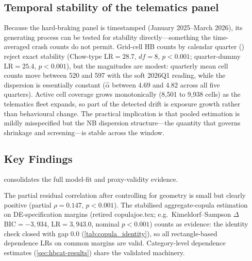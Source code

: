 \documentclass[letterpaper,8pt]{extarticle}  %
\newcommand{\file}[1]{{\ttfamily\def\_{\textunderscore\allowbreak}#1}}
\begin{document}
\begin{doublespacing}
\begin{linenumbers}


\subsection{Temporal stability of the telematics panel}\label{sec:temporal-stability}

Because the hard-braking panel is timestamped (January 2025--March 2026), its generating process can be tested for stability directly---something the time-averaged crash counts do not permit. Grid-cell HB counts by calendar quarter () reject exact stability (Chow-type LR$=28.7$, $df=8$, $p<0.001$; quarter-dummy LR$=25.4$, $p<0.001$), but the magnitudes are modest: quarterly mean cell counts move between 520 and 597 with the soft 2026Q1 reading, while the dispersion is essentially constant ($\hat\alpha$ between 4.69 and 4.82 across all five quarters). Active cell coverage grows monotonically (8,501 to 9,938 cells) as the telematics fleet expands, so part of the detected drift is exposure growth rather than behavioural change. The practical implication is that pooled estimation is mildly misspecified but the NB dispersion structure---the quantity that governs shrinkage and screening---is stable across the window.



\FloatBarrier

\subsection{Key Findings}

 consolidates the full model-fit and proxy-validity evidence.



\FloatBarrier The partial residual correlation after controlling for geometry is small but clearly positive (partial $\rho=0.147$, $p<0.001$). The stabilised aggregate-copula estimation on DE-specification margins (retired \file{copula\_joe.tex}; e.g.\ Kimeldorf--Sampson $\Delta$BIC$=-3{,}934$, LR$=3{,}943.0$, nominal $p<0.001$) counts as evidence: the identity check closed with gap $0.0$ (\cref{tab:copula_identity}), so all rectangle-based dependence LRs on common margins are valid. Category-level dependence estimates (\cref{sec:hbcat-results}) share the validated machinery.


\end{linenumbers}
\end{doublespacing}
\end{document}

